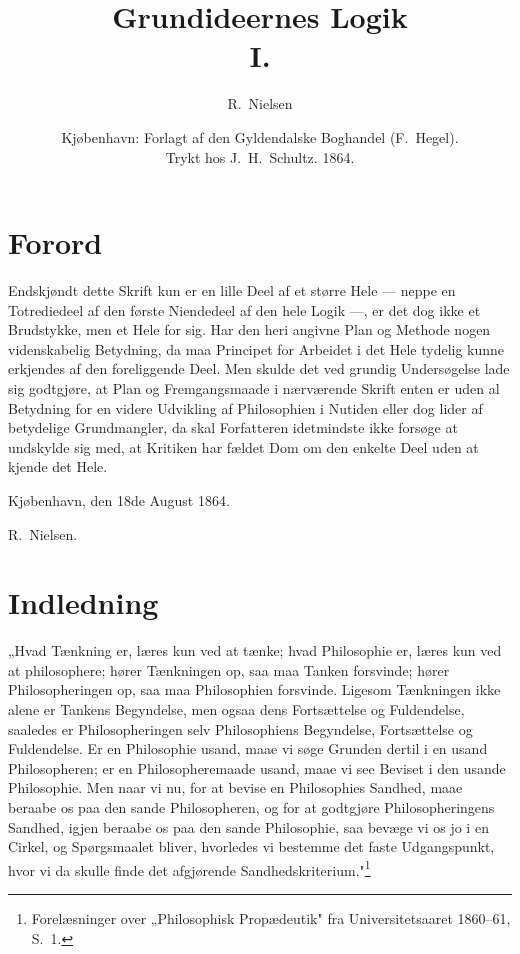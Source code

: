 \documentclass[12pt]{book}
\title{\textbf{Grundideernes Logik}\\[4pt]\large I.}
\author{R.\ Nielsen}
\date{Kjøbenhavn: Forlagt af den Gyldendalske Boghandel (F.\ Hegel).\\[2pt]
  \small Trykt hos J.\ H.\ Schultz. 1864.}
\begin{document}
\maketitle
\tableofcontents

\chapter*{Forord}

\noindent Endskjøndt dette Skrift kun er en lille Deel af et større Hele ---
neppe en Totrediedeel af den første Niendedeel af den hele Logik ---, er det
dog ikke et Brudstykke, men et Hele for sig. Har den heri angivne Plan og
Methode nogen videnskabelig Betydning, da maa Principet for Arbeidet i det
Hele tydelig kunne erkjendes af den foreliggende Deel. Men skulde det ved
grundig Undersøgelse lade sig godtgjøre, at Plan og Fremgangsmaade i
nærværende Skrift enten er uden al Betydning for en videre Udvikling af
Philosophien i Nutiden eller dog lider af betydelige Grundmangler, da skal
Forfatteren idetmindste ikke forsøge at undskylde sig med, at Kritiken har
fældet Dom om den enkelte Deel uden at kjende det Hele.

\bigskip
\noindent Kjøbenhavn, den 18de August 1864.
\nopagebreak
\par\hfill R.\ Nielsen.

\chapter*{Indledning}

\noindent „Hvad Tænkning er, læres kun ved at tænke; hvad Philosophie er,
læres kun ved at philosophere; hører Tænkningen op, saa maa Tanken forsvinde;
hører Philosopheringen op, saa maa Philosophien forsvinde. Ligesom Tænkningen
ikke alene er Tankens Begyndelse, men ogsaa dens Fortsættelse og Fuldendelse,
saaledes er Philosopheringen selv Philosophiens Begyndelse, Fortsættelse og
Fuldendelse. Er en Philosophie usand, maae vi søge Grunden dertil i en usand
Philosopheren; er en Philosopheremaade usand, maae vi see Beviset i den usande
Philosophie. Men naar vi nu, for at bevise en Philosophies Sandhed, maae
beraabe os paa den sande Philosopheren, og for at godtgjøre Philosopheringens
Sandhed, igjen beraabe os paa den sande Philosophie, saa bevæge vi os jo i en
Cirkel, og Spørgsmaalet bliver, hvorledes vi bestemme det faste Udgangspunkt,
hvor vi da skulle finde det afgjørende Sandhedskriterium."\footnote{Forelæsninger
over „Philosophisk Propædeutik" fra Universitetsaaret 1860--61, S.~1.}
\end{document}
